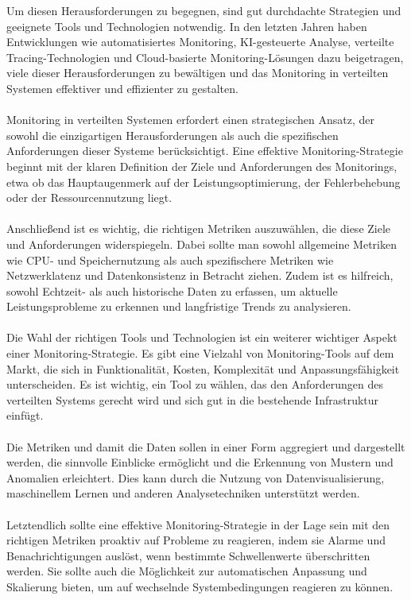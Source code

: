 Um diesen Herausforderungen zu begegnen, sind gut durchdachte Strategien und geeignete Tools und Technologien notwendig. In den letzten Jahren haben Entwicklungen wie automatisiertes Monitoring, KI-gesteuerte Analyse, verteilte Tracing-Technologien und Cloud-basierte Monitoring-Lösungen dazu beigetragen, viele dieser Herausforderungen zu bewältigen und das Monitoring in verteilten Systemen effektiver und effizienter zu gestalten.
\\\\
Monitoring in verteilten Systemen erfordert einen strategischen Ansatz, der sowohl die einzigartigen Herausforderungen als auch die spezifischen Anforderungen dieser Systeme berücksichtigt. Eine effektive Monitoring-Strategie beginnt mit der klaren Definition der Ziele und Anforderungen des Monitorings, etwa ob das Hauptaugenmerk auf der Leistungsoptimierung, der Fehlerbehebung oder der Ressourcennutzung liegt.
\\\\
Anschließend ist es wichtig, die richtigen Metriken auszuwählen, die diese Ziele und Anforderungen widerspiegeln. Dabei sollte man sowohl allgemeine Metriken wie CPU- und Speichernutzung als auch spezifischere Metriken wie Netzwerklatenz und Datenkonsistenz in Betracht ziehen. Zudem ist es hilfreich, sowohl Echtzeit- als auch historische Daten zu erfassen, um aktuelle Leistungsprobleme zu erkennen und langfristige Trends zu analysieren.
\\\\
Die Wahl der richtigen Tools und Technologien ist ein weiterer wichtiger Aspekt einer Monitoring-Strategie. Es gibt eine Vielzahl von Monitoring-Tools auf dem Markt, die sich in Funktionalität, Kosten, Komplexität und Anpassungsfähigkeit unterscheiden. Es ist wichtig, ein Tool zu wählen, das den Anforderungen des verteilten Systems gerecht wird und sich gut in die bestehende Infrastruktur einfügt.
\\\\
Die Metriken und damit die  Daten sollen in einer Form aggregiert und dargestellt werden, die sinnvolle Einblicke ermöglicht und die Erkennung von Mustern und Anomalien erleichtert. Dies kann durch die Nutzung von Datenvisualisierung, maschinellem Lernen und anderen Analysetechniken unterstützt werden.
\\\\
Letztendlich sollte eine effektive Monitoring-Strategie in der Lage sein mit den richtigen Metriken proaktiv auf Probleme zu reagieren, indem sie Alarme und Benachrichtigungen auslöst, wenn bestimmte Schwellenwerte überschritten werden. Sie sollte auch die Möglichkeit zur automatischen Anpassung und Skalierung bieten, um auf wechselnde Systembedingungen reagieren zu können.
